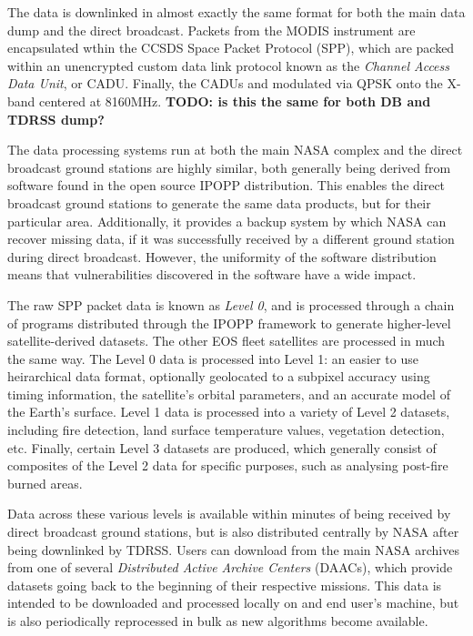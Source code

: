 
The data is downlinked in almost exactly the same format for both the main data dump and the direct broadcast.
Packets from the MODIS instrument are encapsulated wthin the CCSDS Space Packet Protocol (SPP), which are packed within an unencrypted custom data link protocol known as the \textit{Channel Access Data Unit}, or CADU.
Finally, the CADUs and modulated via QPSK onto the X-band centered at 8160MHz. \textbf{TODO: is this the same for both DB and TDRSS dump?}

The data processing systems run at both the main NASA complex and the direct broadcast ground stations are highly similar, both generally being derived from software found in the open source IPOPP distribution.
This enables the direct broadcast ground stations to generate the same data products, but for their particular area.
Additionally, it provides a backup system by which NASA can recover missing data, if it was successfully received by a different ground station during direct broadcast.
However, the uniformity of the software distribution means that vulnerabilities discovered in the software have a wide impact.

The raw SPP packet data is known as \textit{Level 0}, and is processed through a chain of programs distributed through the IPOPP framework to generate higher-level satellite-derived datasets.
The other EOS fleet satellites are processed in much the same way.
The Level 0 data is processed into Level 1: an easier to use heirarchical data format, optionally geolocated to a subpixel accuracy using timing information, the satellite's orbital parameters, and an accurate model of the Earth's surface.
Level 1 data is processed into a variety of Level 2 datasets, including fire detection, land surface temperature values, vegetation detection, etc.
Finally, certain Level 3 datasets are produced, which generally consist of composites of the Level 2 data for specific purposes, such as analysing post-fire burned areas.

Data across these various levels is available within minutes of being received by direct broadcast ground stations, but is also distributed centrally by NASA after being downlinked by TDRSS.
Users can download from the main NASA archives from one of several \textit{Distributed Active Archive Centers} (DAACs), which provide datasets going back to the beginning of their respective missions.
This data is intended to be downloaded and processed locally on and end user's machine, but is also periodically reprocessed in bulk as new algorithms become available.


